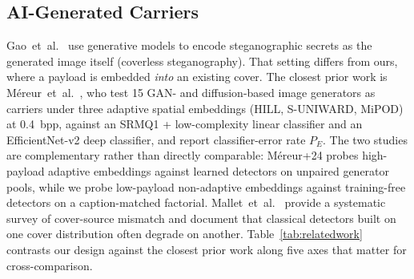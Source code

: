 \documentclass[10pt,twocolumn,a4paper]{article}
\begin{document}
\subsection{AI-Generated Carriers}
Gao~et~al.~\cite{gao2022ai} use generative models to encode steganographic secrets as the generated image itself (coverless steganography). That setting differs from ours, where a payload is embedded \emph{into} an existing cover. The closest prior work is M\'{e}reur~et~al.~\cite{mereur2024deepfake}, who test 15 GAN- and diffusion-based image generators as carriers under three adaptive spatial embeddings (HILL, S-UNIWARD, MiPOD) at 0.4~bpp, against an SRMQ1 + low-complexity linear classifier and an EfficientNet-v2 deep classifier, and report classifier-error rate $P_E$. The two studies are complementary rather than directly comparable: M\'ereur+24 probes high-payload adaptive embeddings against learned detectors on unpaired generator pools, while we probe low-payload non-adaptive embeddings against training-free detectors on a caption-matched factorial. Mallet~et~al.~\cite{mallet2024csm} provide a systematic survey of cover-source mismatch and document that classical detectors built on one cover distribution often degrade on another. Table~\ref{tab:relatedwork} contrasts our design against the closest prior work along five axes that matter for cross-comparison.
\end{document}
